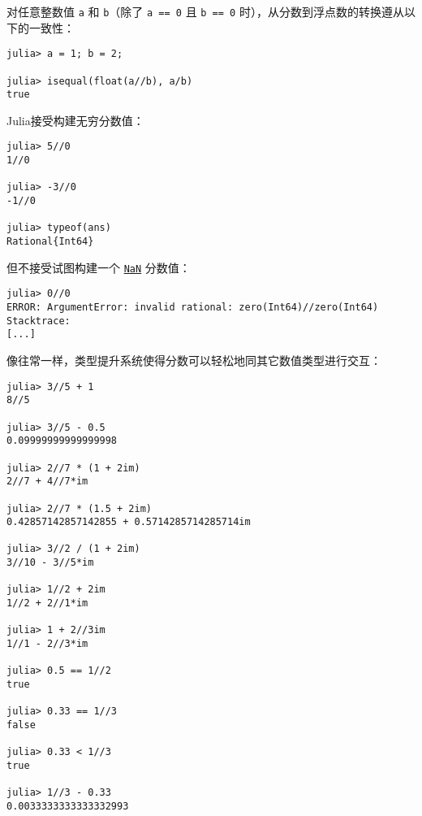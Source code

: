 对任意整数值 \texttt{a} 和 \texttt{b}（除了 \texttt{a == 0} 且 \texttt{b == 0} 时），从分数到浮点数的转换遵从以下的一致性：




\begin{verbatim}
julia> a = 1; b = 2;

julia> isequal(float(a//b), a/b)
true
\end{verbatim}



Julia接受构建无穷分数值：




\begin{verbatim}
julia> 5//0
1//0

julia> -3//0
-1//0

julia> typeof(ans)
Rational{Int64}
\end{verbatim}



但不接受试图构建一个 \hyperlink{11449618129446476597}{\texttt{NaN}} 分数值：




\begin{verbatim}
julia> 0//0
ERROR: ArgumentError: invalid rational: zero(Int64)//zero(Int64)
Stacktrace:
[...]
\end{verbatim}



像往常一样，类型提升系统使得分数可以轻松地同其它数值类型进行交互：




\begin{verbatim}
julia> 3//5 + 1
8//5

julia> 3//5 - 0.5
0.09999999999999998

julia> 2//7 * (1 + 2im)
2//7 + 4//7*im

julia> 2//7 * (1.5 + 2im)
0.42857142857142855 + 0.5714285714285714im

julia> 3//2 / (1 + 2im)
3//10 - 3//5*im

julia> 1//2 + 2im
1//2 + 2//1*im

julia> 1 + 2//3im
1//1 - 2//3*im

julia> 0.5 == 1//2
true

julia> 0.33 == 1//3
false

julia> 0.33 < 1//3
true

julia> 1//3 - 0.33
0.0033333333333332993
\end{verbatim}



\hypertarget{3772396547767597421}{}


